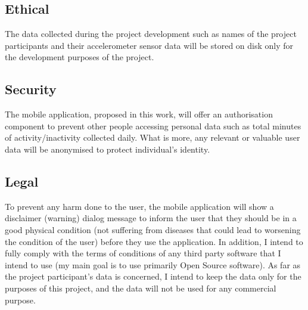     \subsection{Ethical}
    The data collected during the project development such as names of the project participants and their accelerometer sensor data will be stored on disk only for the development purposes of the project. 
    
    \subsection{Security}
    The mobile application, proposed in this work, will offer an authorisation component to prevent other people accessing personal data such as total minutes of activity/inactivity collected daily. What is more, any relevant or valuable user data will be anonymised to protect individual’s identity.

    
    \subsection{Legal}
    To prevent any harm done to the user, the mobile application will show a disclaimer (warning) dialog message to inform the user that they should be in a good physical condition (not suffering from diseases that could lead to worsening the condition of the user) before they use the application. In addition, I intend to fully comply with the terms of conditions of any third party software that I intend to use (my main goal is to use primarily Open Source software). As far as the project participant’s data is concerned, I intend to keep the data only for the purposes of this project, and the data will not be used for any commercial purpose. 
